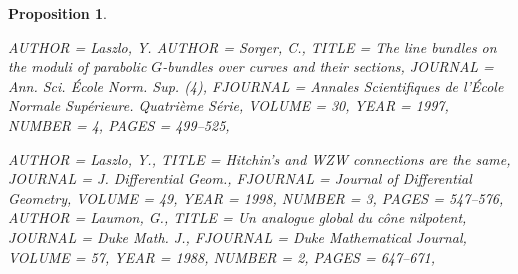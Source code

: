 \documentclass[11pt]{amsart}
\newtheorem{proposition}[theorem]{Proposition}
\numberwithin{theorem}{subsection}
\begin{document}
{\begin{proposition}
\begin{bibdiv}
\begin{biblist}

 {
    AUTHOR = {Laszlo, Y.}
    AUTHOR = {Sorger, C.},
     TITLE = {The line bundles on the moduli of parabolic {$G$}-bundles over
              curves and their sections},
   JOURNAL = {Ann. Sci. \'{E}cole Norm. Sup. (4)},
  FJOURNAL = {Annales Scientifiques de l'\'{E}cole Normale Sup\'{e}rieure. Quatri\`eme
              S\'{e}rie},
    VOLUME = {30},
      YEAR = {1997},
    NUMBER = {4},
     PAGES = {499--525},
}

 {
    AUTHOR = {Laszlo, Y.},
     TITLE = {Hitchin's and {WZW} connections are the same},
   JOURNAL = {J. Differential Geom.},
  FJOURNAL = {Journal of Differential Geometry},
    VOLUME = {49},
      YEAR = {1998},
    NUMBER = {3},
     PAGES = {547--576},
}
 {
    AUTHOR = {Laumon, G.},
     TITLE = {Un analogue global du c\^one nilpotent},
   JOURNAL = {Duke Math. J.},
  FJOURNAL = {Duke Mathematical Journal},
    VOLUME = {57},
      YEAR = {1988},
    NUMBER = {2},
     PAGES = {647--671},
}
	

\end{biblist}
\end{bibdiv}
\end{proposition}}
\end{document}
